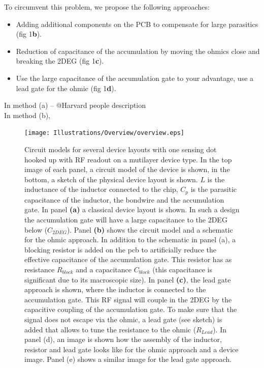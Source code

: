 \documentclass{article}
\begin{document}
	To circumvent this problem, we propose the following approaches:
	\begin{itemize}
		\item Adding additional components on the PCB to compensate for large parasitics (fig 1\textbf{b}).
		\item Reduction of capacitance of the accumulation by moving the ohmics close and breaking the 2DEG (fig 1\textbf{c}).
		\item Use the large capacitance of the accumulation gate to your advantage, use a lead gate for the ohmic (fig 1\textbf{d}).
	\end{itemize}
	In method (a) -- @Harvard people description
	\\
	In method (b), 
	\\
	\color{black}
\begin{figure}
	\texttt{[image: Illustrations/Overview/overview.eps]}
	\caption{Circuit models for several device layouts with one sensing dot hooked up with RF readout on a mutilayer device type.  In the top image of each panel, a circuit model of the device is shown, in the bottom, a sketch of the physical device layout is shown. $L$ is the inductance of the inductor connected to the chip, $C_p$ is the parasitic capacitance of the inductor, the bondwire and the accumulation gate. In panel \textbf{(a)} a classical device layout is shown. In such a design the accumulation gate will have a large capacitance to the 2DEG below ($C_{2DEG}$). Panel \textbf{(b)} shows the circuit model and a schematic for the ohmic approach. In addition to the schematic in panel (a), a blocking resistor is added on the pcb to artificially reduce the effective capacitance of the accumulation gate. This resistor has as resistance $R_{block}$ and a capacitance $C_{block}$ (this capacitance is significant due to its macroscopic size). In panel \textbf{(c)}, the lead gate approach is shown, where the inductor is connected to the accumulation gate. This RF signal will couple in the 2DEG by the capacitive coupling of the accumulation gate. To make sure that the signal does not escape via the ohmic, a lead gate (see sketch) is added that allows to tune the resistance to the ohmic ($R_{Lead}$). In panel (d), an image is shown how the assembly of the inductor, resistor and lead gate looks like for the ohmic approach and a device image. Panel (e) shows a similar image for the lead gate approach.}
	\label{fig:overview}
\end{figure}
\end{document}
